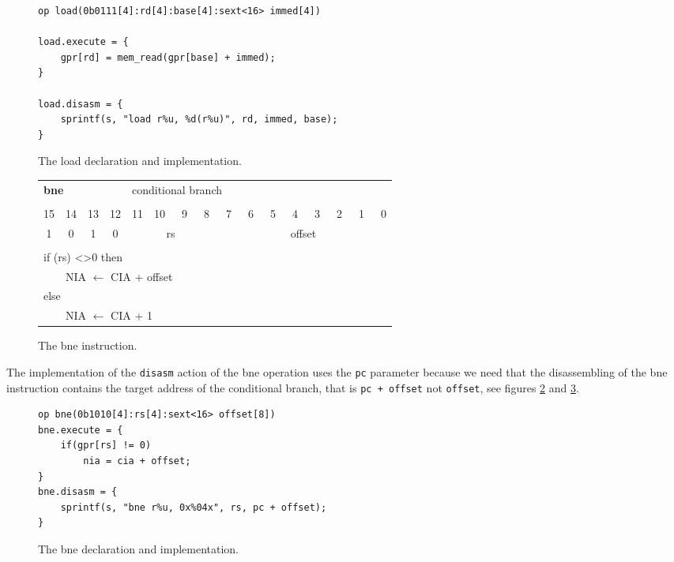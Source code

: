 \begin{figure}[h!tb]
\begin{center}
\begin{verbatim}
op load(0b0111[4]:rd[4]:base[4]:sext<16> immed[4])

load.execute = {
    gpr[rd] = mem_read(gpr[base] + immed);
}

load.disasm = {
    sprintf(s, "load r%u, %d(r%u)", rd, immed, base);
}
\end{verbatim}
\caption{The load declaration and implementation.}
\label{load_decl}
\end{center}
\end{figure}

\begin{figure}[h!tb]
\begin{center}
	\begin{tabular}{cccccccccccccccc}
		\multicolumn{4}{l}{\Large{\bf{bne}}} & \multicolumn{12}{l}{conditional branch}\\
		\multicolumn{16}{c}{}\\
		15  &  14  &  13  &  12  &  11  &  10  &  ~9  & ~8  &  ~7  &  ~6  &  ~5  &  ~4  &  ~3  &  ~2  &  ~1  &  ~0 \\
		\hline
		\multicolumn{1}{|c|}{1}  & \multicolumn{1}{|c|}{0} & \multicolumn{1}{|c|}{1} & \multicolumn{1}{|c|}{0} & \multicolumn{4}{|c|}{rs} &\multicolumn{8}{|c|}{offset}\\
		\hline
		\multicolumn{16}{c}{}\\
		\multicolumn{16}{l}{if (rs) \textless \textgreater 0 then}\\
		\multicolumn{1}{l}{} &\multicolumn{15}{l}{NIA $\leftarrow$ CIA + offset}\\
		\multicolumn{16}{l}{else}\\
		\multicolumn{1}{l}{} & \multicolumn{15}{l}{NIA $\leftarrow$ CIA + 1}\\
	\end{tabular}
\end{center}
\caption{The bne instruction.}
\label{bne_instr}
\end{figure}

The implementation of the \texttt{disasm} action of the bne operation uses the \texttt{pc} parameter because we need that the disassembling of the bne instruction contains the target address of the conditional branch, that is \texttt{pc + offset} not \texttt{offset}, see figures \ref{bne_instr} and \ref{bne_decl}.

\begin{figure}[h!tb]
\begin{center}
\begin{verbatim}
op bne(0b1010[4]:rs[4]:sext<16> offset[8])
bne.execute = {
    if(gpr[rs] != 0)
        nia = cia + offset;
}
bne.disasm = {
    sprintf(s, "bne r%u, 0x%04x", rs, pc + offset);
}
\end{verbatim}
\caption{The bne declaration and implementation.}
\label{bne_decl}
\end{center}
\end{figure}

